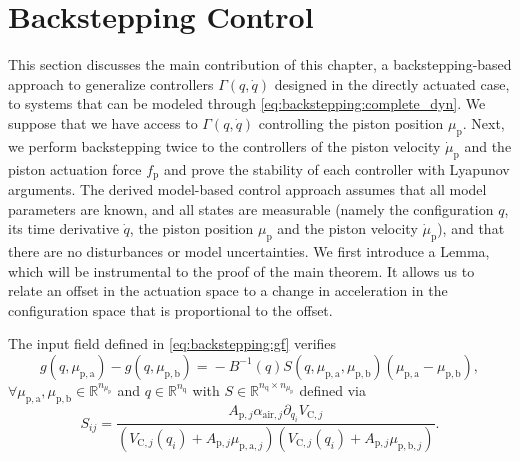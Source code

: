 \section{Backstepping Control}\label{sec:backstepping:backstepping_proof}

This section discusses the main contribution of this chapter, a backstepping-based approach to generalize controllers $\Gamma(q,\dot{q})$ designed in the directly actuated case, to systems that can be modeled through \eqref{eq:backstepping:complete_dyn}.
We suppose that we have access to $\Gamma(q, \dot{q})$ controlling the piston position $\mu_\mathrm{p}$. Next, we perform backstepping twice to the controllers of the piston velocity $\dot{\mu}_\mathrm{p}$ and the piston actuation force $f_\mathrm{p}$ and prove the stability of each controller with Lyapunov arguments.
The derived model-based control approach assumes that all model parameters are known, and all states are measurable (namely the configuration $q$, its time derivative $\dot{q}$, the piston position $\mu_\mathrm{p}$ and the piston velocity $\dot{\mu}_\mathrm{p}$), and that there are no disturbances or model uncertainties. 
We first introduce a Lemma, which will be instrumental to the proof of the main theorem. It allows us to relate an offset in the actuation space to a change in acceleration in the configuration space that is proportional to the offset.
%
\begin{lemma}\label{lemma:f_g_S}%
The input field defined in \eqref{eq:backstepping:gf} verifies
%
\begin{equation*}
    g(q,\mu_{\mathrm{p},\mathrm{a}}) - g(q,\mu_{\mathrm{p},\mathrm{b}}) \!=\!  -B^{-1}\!(q)S(q,\mu_{\mathrm{p},\mathrm{a}},\mu_{\mathrm{p},\mathrm{b}})(\mu_{\mathrm{p},\mathrm{a}} \!- \mu_{\mathrm{p},\mathrm{b}}),    
\end{equation*}
%
$\forall \mu_{\mathrm{p},\mathrm{a}},\mu_{\mathrm{p},\mathrm{b}} \in \mathbb{R}^{n_{\mu_\mathrm{p}}}$ and $q \in \mathbb{R}^{n_{\mathrm{q}}}$
	with $S \in \mathbb{R}^{n_{\mathrm{q}} \times n_{\mu_\mathrm{p}}} $ defined via
	\begin{equation*}
	    S_{ij} = \frac{ A_{\mathrm{p},j} \alpha_{\mathrm{air},j} \partial_{q_i}V_{\mathrm{C},j}}{(V_{\mathrm{C},j}(q_i) + A_{\mathrm{p},j} \mu_{\mathrm{p},\mathrm{a},j})(V_{\mathrm{C},j}(q_i) + A_{\mathrm{p},j} \mu_{\mathrm{p},\mathrm{b},j})}.
	\end{equation*}
\end{lemma}
%
